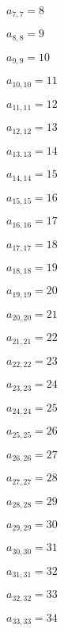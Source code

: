 \documentclass[a4paper,12pt]{article}
\begin{document}
$a _{ 7, 7 } = 8$

$a _{ 8, 8 } = 9$

$a _{ 9, 9 } = 10$

$a _{ 10, 10 } = 11$

$a _{ 11, 11 } = 12$

$a _{ 12, 12 } = 13$

$a _{ 13, 13 } = 14$

$a _{ 14, 14 } = 15$

$a _{ 15, 15 } = 16$

$a _{ 16, 16 } = 17$

$a _{ 17, 17 } = 18$

$a _{ 18, 18 } = 19$

$a _{ 19, 19 } = 20$

$a _{ 20, 20 } = 21$

$a _{ 21, 21 } = 22$

$a _{ 22, 22 } = 23$

$a _{ 23, 23 } = 24$

$a _{ 24, 24 } = 25$

$a _{ 25, 25 } = 26$

$a _{ 26, 26 } = 27$

$a _{ 27, 27 } = 28$

$a _{ 28, 28 } = 29$

$a _{ 29, 29 } = 30$

$a _{ 30, 30 } = 31$

$a _{ 31, 31 } = 32$

$a _{ 32, 32 } = 33$

$a _{ 33, 33 } = 34$
\end{document}
